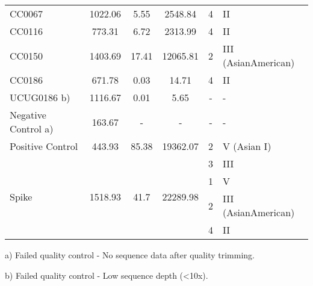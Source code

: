 \begin{table}[h!]
{\begin{tabular}{@{}lccccl@{}}
CC0067                & 1022.06 & 5.55  & 2548.84  & 4 & II                  \\
CC0116                & 773.31  & 6.72  & 2313.99  & 4 & II                  \\
CC0150                & 1403.69 & 17.41 & 12065.81 & 2 & III (AsianAmerican) \\
CC0186                & 671.78  & 0.03  & 14.71    & 4 & II                  \\
UCUG0186   b)         & 1116.67 & 0.01  & 5.65     & - & -                   \\
Negative   Control a) & 163.67  & -     & -        & - & -                   \\
Positive   Control     & 443.93                   & 85.38                 & 19362.07                           & 2        & V (Asian I) \\
\multirow{4}{*}{Spike} & \multirow{4}{*}{1518.93} & \multirow{4}{*}{41.7} & \multirow{4}{*}{22289.98}          & 3        & III         \\
                      &         &       &          & 1 & V                   \\
                      &         &       &          & 2 & III (AsianAmerican) \\
                      &         &       &          & 4 & II                 
\end{tabular}%
}
\small
\item a) Failed quality control - No sequence data after quality trimming.
\item b) Failed quality control - Low sequence depth (<10x).
\end{table}
